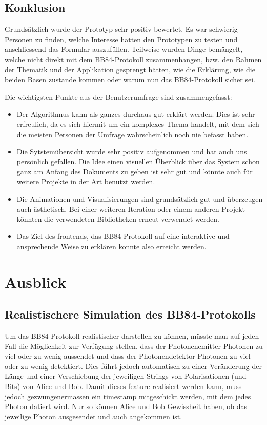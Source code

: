 \documentclass[a4paper,10.2pt,pdftex]{scrartcl}%
\begin{document}
\subsection{Konklusion}
Grundsätzlich wurde der Prototyp sehr positiv bewertet. Es war schwierig Personen zu finden, welche Interesse hatten den Prototypen zu testen und anschliessend das Formular auszufüllen. Teilweise wurden Dinge bemängelt, welche nicht direkt mit dem BB84-Protokoll zusammenhangen, bzw. den Rahmen der Thematik und der Applikation gesprengt hätten, wie die Erklärung, wie die beiden Basen zustande kommen oder warum nun das BB84-Protokoll sicher sei.

Die wichtigsten Punkte aus der Benutzerumfrage sind zusammengefasst:

\begin{itemize}
\item Der Algorithmus kann als ganzes durchaus gut erklärt werden. Dies ist sehr erfreulich, da es sich hiermit um ein komplexes Thema handelt, mit dem sich die meisten Personen der Umfrage wahrscheinlich noch nie befasst haben.
\item Die Sytstemübersicht wurde sehr positiv aufgenommen und hat auch uns persönlich gefallen. Die Idee einen visuellen Überblick über das System schon ganz am Anfang des Dokuments zu geben ist sehr gut und könnte auch für weitere Projekte in der Art benutzt werden.
\item Die Animationen und Visualisierungen sind grundsätzlich gut und überzeugen auch ästhetisch. Bei einer weiteren Iteration oder einem anderen Projekt könnten die verwendeten Bibliotheken erneut verwendet werden.
\item Das Ziel des frontends, das BB84-Protokoll auf eine interaktive und ansprechende Weise zu erklären konnte also erreicht werden. 
\end{itemize}


\section{Ausblick}
\subsection{ Realistischere Simulation des BB84-Protokolls}

Um das BB84-Protokoll realistischer darstellen zu können, müsste man auf jeden Fall die Möglichkeit zur Verfügung stellen, dass der Photonenemitter Photonen zu viel oder zu wenig aussendet und dass der Photonendetektor Photonen zu viel oder zu wenig detektiert. Dies führt jedoch automatisch zu einer Veränderung der Länge und einer Verschiebung der jeweiligen Strings von Polarisationen (und Bits) von Alice und Bob. Damit dieses feature realisiert werden kann, muss jedoch gezwungenermassen ein timestamp mitgeschickt werden, mit dem jedes Photon datiert wird. Nur so können Alice und Bob Gewissheit haben, ob das jeweilige Photon ausgesendet und auch angekommen ist.
\end{document}
